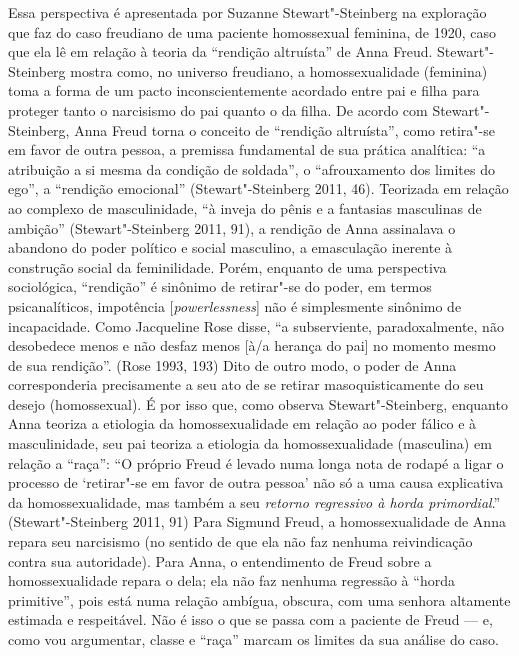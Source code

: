 Essa perspectiva é apresentada por Suzanne Stewart"-Steinberg na
exploração que faz do caso freudiano de uma paciente homossexual
feminina, de 1920, caso que ela lê em relação à teoria da ``rendição
altruísta'' de Anna Freud. Stewart"-Steinberg mostra como, no universo
freudiano, a homossexualidade (feminina) toma a forma de um pacto
inconscientemente acordado entre pai e filha para proteger tanto o
narcisismo do pai quanto o da filha. De acordo com Stewart"-Steinberg,
Anna Freud torna o conceito de ``rendição altruísta'', como retira"-se em
favor de outra pessoa, a premissa fundamental de sua prática analítica:
``a atribuição a si mesma da condição de soldada'', o ``afrouxamento dos
limites do ego'', a ``rendição emocional'' (Stewart"-Steinberg 2011, 46).
Teorizada em relação ao complexo de masculinidade, ``à inveja do pênis e
a fantasias masculinas de ambição'' (Stewart"-Steinberg 2011, 91), a
rendição de Anna assinalava o abandono do poder político e social
masculino, a emasculação inerente à construção social da feminilidade.
Porém, enquanto de uma perspectiva sociológica, ``rendição'' é sinônimo de
retirar"-se do poder, em termos psicanalíticos, impotência
{[}\emph{powerlessness}{]} não é simplesmente sinônimo de incapacidade.
Como Jacqueline Rose disse, ``a subserviente, paradoxalmente, não
desobedece menos e não desfaz menos {[}à/a herança do pai{]} no momento
mesmo de sua rendição''. (Rose 1993, 193) Dito de outro modo, o poder de
Anna corresponderia precisamente a seu ato de se retirar
masoquisticamente do seu desejo (homossexual). É por isso que, como
observa Stewart"-Steinberg, enquanto Anna teoriza a etiologia da
homossexualidade em relação ao poder fálico e à masculinidade, seu pai
teoriza a etiologia da homossexualidade (masculina) em relação a ``raça'':
``O próprio Freud é levado numa longa nota de rodapé a ligar o processo
de `retirar"-se em favor de outra pessoa' não só a uma causa explicativa
da homossexualidade, mas também a seu \emph{retorno regressivo à horda
primordial}.'' (Stewart"-Steinberg 2011, 91) Para Sigmund Freud, a
homossexualidade de Anna repara seu narcisismo (no sentido de que ela
não faz nenhuma reivindicação contra sua autoridade). Para Anna, o
entendimento de Freud sobre a homossexualidade repara o dela; ela não
faz nenhuma regressão à ``horda primitive'', pois está numa relação
ambígua, obscura, com uma senhora altamente estimada e respeitável. Não
é isso o que se passa com a paciente de Freud --- e, como vou argumentar,
classe e ``raça'' marcam os limites da sua análise do caso.


